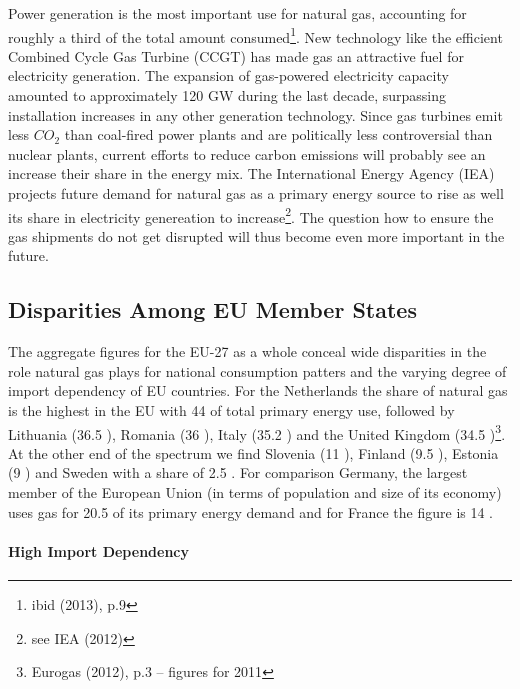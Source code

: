 \documentclass[11pt,a4paper,english]{scrreprt}
\begin{document}
Power generation is the most important use for natural gas, accounting for
roughly a third of the total amount consumed\footnote{ibid (2013), p.9}. New
technology like the efficient Combined Cycle Gas Turbine (CCGT) has made gas an
attractive fuel for electricity generation. The expansion of gas-powered
electricity capacity amounted to approximately 120 GW during the last decade,
surpassing installation increases in any other generation technology. Since gas
turbines emit less $CO_{2}$ than coal-fired power plants and are politically
less controversial than nuclear plants, current efforts to reduce carbon
emissions will probably see an increase their share in the energy mix. The
International Energy Agency (IEA) projects future demand for natural gas as a
primary energy source to rise as well its share in electricity genereation to
increase\footnote{see IEA (2012)}. The question how to ensure the gas shipments
do not get disrupted will thus become even more important in the future.\par


    \subsection{Disparities Among EU Member States}

The aggregate figures for the EU-27 as a whole conceal wide disparities in the
role natural gas plays for national consumption patters and the varying degree
of import dependency of EU countries. For the Netherlands the share of natural
gas is the highest in the EU with 44 \textdiscount{} of total primary energy
use, followed by Lithuania (36.5 \textdiscount{}), Romania (36 \textdiscount{}),
Italy (35.2 \textdiscount{}) and the United Kingdom (34.5
\textdiscount{})\footnote{Eurogas (2012), p.3 -- figures for 2011}. At the other
end of the spectrum we find Slovenia (11 \textdiscount{}), Finland (9.5
\textdiscount{}), Estonia (9 \textdiscount{}) and Sweden with a share of 2.5
\textdiscount{}. For comparison Germany, the largest member of the European
Union (in terms of population and size of its economy) uses gas for 20.5
\textdiscount{} of its primary energy demand and for France the figure is 14
\textdiscount{}.\par


	\paragraph{High Import Dependency}
\end{document}
